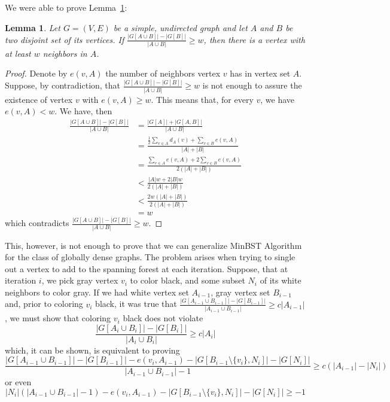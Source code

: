 \documentclass[12pt]{article}
\newtheorem{lemma}[theorem]{Lemma}
\begin{document}
We were able to prove Lemma~\ref{lemma1}:
\begin{lemma} \label{lemma1}
  Let $G = (V, E)$ be a simple, undirected graph and let $A$ and $B$ be two disjoint set of its vertices.
  If $\frac{|G[A \cup B]| - |G[B]|}{|A \cup B|} \ge w$, then there is a vertex with at least $w$ neighbors in $A$.
\end{lemma}
\begin{proof}
  Denote by $e(v, A)$ the number of neighbors vertex $v$ has in vertex set $A$.
  Suppose, by contradiction, that $\frac{|G[A \cup B]| - |G[B]|}{|A \cup B|} \ge w$ is not enough to assure the existence of vertex $v$ with $e(v, A) \ge w$.
  This means that, for every $v$, we have $e(v, A) < w$.
  We have, then
  \begin{align*}
    \frac{|G[A \cup B]| - |G[B]|}{|A \cup B|} &= \frac{|G[A]| + |G[A, B]|}{|A \cup B|} \\
                                              &= \frac{\frac{1}{2}\sum_{v \in A}d_A(v) + \sum_{v \in B}e(v, A)}{|A| + |B|} \\
                                              &= \frac{\sum_{v \in A}e(v, A) + 2\sum_{v \in B}e(v, A)}{2(|A| + |B|)} \\
                                              &< \frac{|A|w + 2|B|w}{2(|A| + |B|)} \\
                                              &< \frac{2w(|A| + |B|)}{2(|A| + |B|)} \\
                                              &= w
  \end{align*}
  which contradicts $\frac{|G[A \cup B]| - |G[B]|}{|A \cup B|} \ge w$.
\end{proof}
This, however, is not enough to prove that we can generalize MinBST Algorithm for the class of globally dense graphs.
The problem arises when trying to single out a vertex to add to the spanning forest at each iteration.
Suppose, that at iteration $i$, we pick gray vertex $v_i$ to color black, and some subset $N_i$ of its white neighbors to color gray.
If we had white vertex set $A_{i - 1}$, gray vertex set $B_{i - 1}$ and, prior to coloring $v_i$ black, it was true that $\frac{|G[A_{i - 1} \cup B_{i - 1}]| - |G[B_{i - 1}]|}{|A_{i - 1} \cup B_{i - 1}|} \ge c|A_{i - 1}|$, we must show that coloring $v_i$ black does not violate
$$\frac{|G[A_i \cup B_i]| - |G[B_i]|}{|A_i \cup B_i|} \ge c|A_i|$$
which, it can be shown, is equivalent to proving
$$\frac{|G[A_{i - 1} \cup B_{i - 1}]| - |G[B_{i - 1}]| - e(v_i, A_{i - 1}) - |G[B_{i - 1} \setminus \{v_i\}, N_i]| - |G[N_i]|}{|A_{i - 1} \cup B_{i - 1}| - 1} \ge c(|A_{i - 1}| - |N_i|)$$
or even
$$|N_i|(|A_{i-1} \cup B_{i-1}| - 1) - e(v_i, A_{i - 1}) - |G[B_{i-1} \setminus \{v_i\}, N_i]| - |G[N_i]| \ge -1$$
\end{document}
